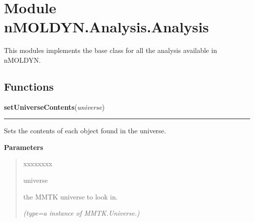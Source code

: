 %
%
%


\section{Module nMOLDYN.Analysis.Analysis}

    \label{nMOLDYN:Analysis:Analysis}
This modules implements the base class for all the analysis available in 
nMOLDYN.



  \subsection{Functions}

    \label{nMOLDYN:Analysis:Analysis:setUniverseContents}

    \vspace{0.5ex}

\hspace{.8\funcindent}\begin{boxedminipage}{\funcwidth}

    \raggedright \textbf{setUniverseContents}(\textit{universe})

    \vspace{-1.5ex}

    \rule{\textwidth}{0.5\fboxrule}
\setlength{\parskip}{2ex}
    Sets the contents of each object found in the universe.

\setlength{\parskip}{1ex}
      \textbf{Parameters}
      \vspace{-1ex}

      \begin{quote}
        \begin{Ventry}{xxxxxxxx}

          \item[universe]

          the MMTK universe to look in.

            {\it (type=a instance of MMTK.Universe.)}

        \end{Ventry}

      \end{quote}

    \end{boxedminipage}


